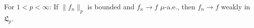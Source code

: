 For $1 < p < \infty$: If $\|f_n\|_p$ is bounded and $f_n \to f$ $\mu$-a.e., then $f_n \to f$ weakly in $\mathfrak{L}_p$.
